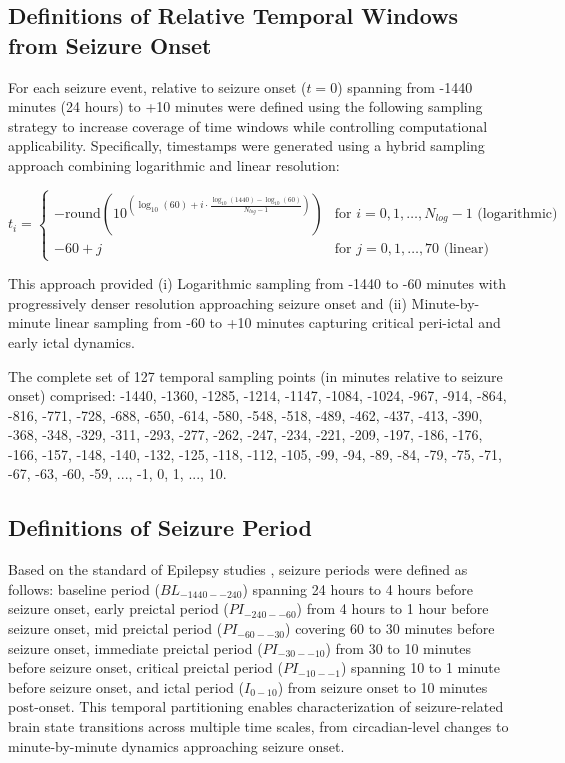 \subsection{Definitions of Relative Temporal Windows from Seizure Onset}
For each seizure event, relative to seizure onset ($t = 0$) spanning from -1440 minutes (24 hours) to +10 minutes were defined using the following sampling strategy to increase coverage of time windows while controlling computational applicability. Specifically, timestamps were generated using a hybrid sampling approach combining logarithmic and linear resolution:

\begin{equation}
t_i = \begin{cases}
-\text{round}(10^{(\log_{10}(60) + i \cdot \frac{\log_{10}(1440) - \log_{10}(60)}{N_{log}-1})}) & \text{for } i = 0, 1, \ldots, N_{log}-1 \text{ (logarithmic)} \\
-60 + j & \text{for } j = 0, 1, \ldots, 70 \text{ (linear)}
\end{cases}
\end{equation}

This approach provided (i) Logarithmic sampling from -1440 to -60 minutes with progressively denser resolution approaching seizure onset and (ii) Minute-by-minute linear sampling from -60 to +10 minutes capturing critical peri-ictal and early ictal dynamics.

The complete set of 127 temporal sampling points (in minutes relative to seizure onset) comprised: -1440, -1360, -1285, -1214, -1147, -1084, -1024, -967, -914, -864, -816, -771, -728, -688, -650, -614, -580, -548, -518, -489, -462, -437, -413, -390, -368, -348, -329, -311, -293, -277, -262, -247, -234, -221, -209, -197, -186, -176, -166, -157, -148, -140, -132, -125, -118, -112, -105, -99, -94, -89, -84, -79, -75, -71, -67, -63, -60, -59, ..., -1, 0, 1, ..., 10.


\subsection{Definitions of Seizure Period}

Based on the standard of Epilepsy studies \cite{Kuhlmann2018SeizurePA}, seizure periods were defined as follows: baseline period ($BL_{-1440--240}$) spanning 24 hours to 4 hours before seizure onset, early preictal period ($PI_{-240--60}$) from 4 hours to 1 hour before seizure onset, mid preictal period ($PI_{-60--30}$) covering 60 to 30 minutes before seizure onset, immediate preictal period ($PI_{-30--10}$) from 30 to 10 minutes before seizure onset, critical preictal period ($PI_{-10--1}$) spanning 10 to 1 minute before seizure onset, and ictal period ($I_{0-10}$) from seizure onset to 10 minutes post-onset. This temporal partitioning enables characterization of seizure-related brain state transitions across multiple time scales, from circadian-level changes to minute-by-minute dynamics approaching seizure onset.


